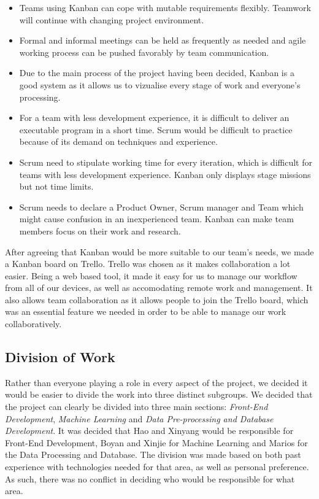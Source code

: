 \documentclass[titlepage]{article}
\begin{document}
\begin{itemize}
\item Teams using Kanban can cope with mutable requirements flexibly. Teamwork will continue with changing project environment.
\item Formal and informal meetings can be held as frequently as needed and agile working process can be pushed favorably by team communication.
\item Due to the main process of the project having been decided, Kanban is a good system as it allows us to vizualise every stage of work and everyone’s processing.
\item For a team with less development experience, it is difficult to deliver an executable program in a short time. Scrum would be difficult to practice because of its demand on techniques and experience.
\item Scrum need to stipulate working time for every iteration, which is difficult for teams with less development experience. Kanban only displays stage missions but not time limits.
\item Scrum needs to declare a Product Owner, Scrum manager and Team which might cause confusion in an inexperienced team. Kanban can make team members focus on their work and research.
\end{itemize}

After agreeing that Kanban would be more suitable to our team's needs, we made a Kanban board on Trello. Trello was chosen as it makes collaboration a lot easier. Being a web based tool, it made it easy for us to manage our workflow from all of our devices, as well as accomodating remote work and management. It also allows team collaboration as it allows people to join the Trello board, which was an essential feature we needed in order to be able to manage our work collaboratively.

\subsection{Division of Work}
Rather than everyone playing a role in every aspect of the project, we decided it would be easier to divide the work into three distinct subgroups. We decided that the project can clearly be divided into three main sections: \textit{Front-End Development}, \textit{Machine Learning} and \textit{Data Pre-processing and Database Development}. It was decided that Hao and Xinyang would be responsible for Front-End Development, Boyan and Xinjie for Machine Learning and Marios for the Data Processing and Database. The division was made based on both past experience with technologies needed for that area, as well as personal preference. As such, there was no conflict in deciding who would be responsible for what area.
\end{document}
